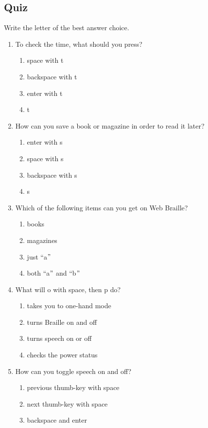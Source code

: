 \documentclass[10pt,letterpaper,twoside]{report}
\begin{document}
{{{\subsection{Quiz}
Write the letter of the best answer choice.
\begin{enumerate}
	\item To check the time, what should you press?
	      \begin{enumerate}
		      \item space with t
		      \item backspace with t
		      \item enter with t
		      \item t
	      \end{enumerate}
	\item How can you save a book or magazine in order to read it later?
	      \begin{enumerate}
		      \item enter with s
		      \item space with s
		      \item backspace with s
		      \item s
	      \end{enumerate}
	\item Which of the following items can you get on Web Braille?
	      \begin{enumerate}
		      \item books
		      \item magazines
		      \item just ``a$"$
		      \item both ``a$"$  and ``b$"$
	      \end{enumerate}
	\item What will o with space, then p do?
	      \begin{enumerate}
		      \item takes you to one-hand mode
		      \item turns Braille on and off
		      \item turns speech on or off
		      \item checks the power status
	      \end{enumerate}
	\item How can you toggle speech on and off?
	      \begin{enumerate}
		      \item previous thumb-key with space
		      \item next thumb-key with space
		      \item backspace and enter

\end{enumerate}
\end{enumerate}}}}
\end{document}
